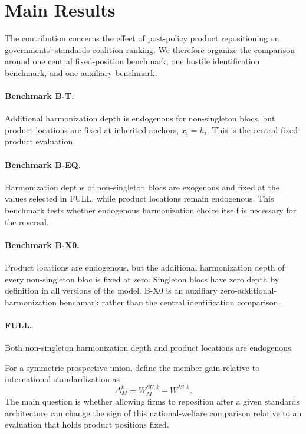 \section{Main Results}\label{sec:results}

The contribution concerns the effect of post-policy product repositioning on governments' standards-coalition ranking. We therefore organize the comparison around one central fixed-position benchmark, one hostile identification benchmark, and one auxiliary benchmark.

\paragraph{Benchmark B-T.} Additional harmonization depth is endogenous for non-singleton blocs, but product locations are fixed at inherited anchors, $x_i=h_i$. This is the central fixed-product evaluation.

\paragraph{Benchmark B-EQ.} Harmonization depths of non-singleton blocs are exogenous and fixed at the values selected in FULL, while product locations remain endogenous. This benchmark tests whether endogenous harmonization choice itself is necessary for the reversal.

\paragraph{Benchmark B-X0.} Product locations are endogenous, but the additional harmonization depth of every non-singleton bloc is fixed at zero. Singleton blocs have zero depth by definition in all versions of the model. B-X0 is an auxiliary zero-additional-harmonization benchmark rather than the central identification comparison.

\paragraph{FULL.} Both non-singleton harmonization depth and product locations are endogenous.

For a symmetric prospective union, define the member gain relative to international standardization as
\begin{equation}\label{eq:delta-member}
\Delta_M^k=W_M^{SU,k}-W^{IS,k}.
\end{equation}
The main question is whether allowing firms to reposition after a given standards architecture can change the sign of this national-welfare comparison relative to an evaluation that holds product positions fixed.


